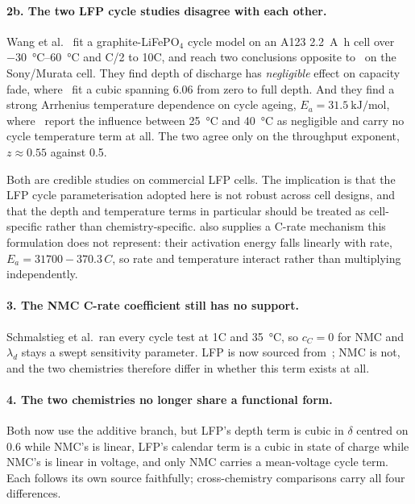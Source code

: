 \documentclass[11pt,a4paper]{article}
\begin{document}
\paragraph{2b. The two LFP cycle studies disagree with each other.}
Wang et al.~\cite{wang2011} fit a graphite-LiFePO$_4$ cycle model on
an A123 \SI{2.2}{\ampere\hour} cell over
\SIrange{-30}{60}{\celsius} and C/2 to 10C, and reach two conclusions
opposite to~\cite{naumann2020} on the Sony/Murata cell. They find
depth of discharge has \emph{negligible} effect on capacity fade,
where~\cite{naumann2020} fit a cubic spanning \num{6.06} from zero to
full depth. And they find a strong Arrhenius temperature dependence on
cycle ageing, $E_a = \SI{31.5}{\kilo\joule\per\mole}$,
where~\cite{naumann2020} report the influence between
\SI{25}{\celsius} and \SI{40}{\celsius} as negligible and carry no
cycle temperature term at all. The two agree only on the throughput
exponent, $z \approx 0.55$ against \num{0.5}.

Both are credible studies on commercial LFP cells. The implication is
that the LFP cycle parameterisation adopted here is not robust across
cell designs, and that the depth and temperature terms in particular
should be treated as cell-specific rather than chemistry-specific.
\cite{wang2011} also supplies a C-rate mechanism this formulation does
not represent: their activation energy falls linearly with rate,
$E_a = 31700 - 370.3\,C$, so rate and temperature interact rather than
multiplying independently.

\paragraph{3. The NMC C-rate coefficient still has no support.}
Schmalstieg et al.\ ran every cycle test at 1C and \SI{35}{\celsius},
so $c_C = 0$ for NMC and $\lambda_d$ stays a swept sensitivity
parameter. LFP is now sourced from~\cite{naumann2020}; NMC is not, and
the two chemistries therefore differ in whether this term exists at
all.

\paragraph{4. The two chemistries no longer share a functional form.}
Both now use the additive branch, but LFP's depth term is cubic in
$\delta$ centred on \num{0.6} while NMC's is linear, LFP's calendar
term is a cubic in state of charge while NMC's is linear in voltage,
and only NMC carries a mean-voltage cycle term. Each follows its own
source faithfully; cross-chemistry comparisons carry all four
differences.
\end{document}
